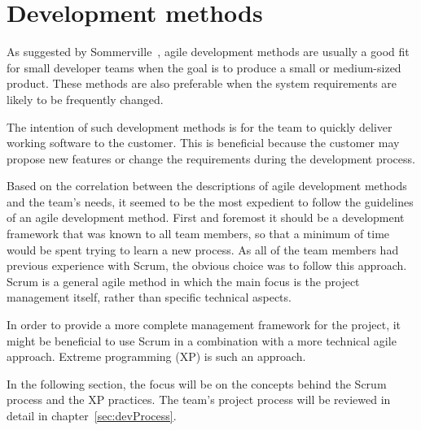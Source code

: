 \section{Development methods}
\label{sec:devMethods}

As suggested by Sommerville~\cite{scrum}, agile development methods are usually a good fit for small developer teams when the goal is to produce a small or medium-sized product. These methods are also preferable when the system requirements are likely to be frequently changed.

The intention of such development methods is for the team to quickly deliver working software to the customer. This is beneficial because the customer may propose new features or change the requirements during the development process.

Based on the correlation between the descriptions of agile development methods and the team's needs, it seemed to be the most expedient to follow the guidelines of an agile development method. First and foremost it should be a development framework that was known to all team members, so that a minimum of time would be spent trying to learn a new process. As all of the team members had previous experience with Scrum, the obvious choice was to follow this approach. Scrum is a general agile method in which the main focus is the project management itself, rather than specific technical aspects.

In order to provide a more complete management framework for the project, it might be beneficial to use Scrum in a combination with a more technical agile approach. Extreme programming (XP) is such an approach.

In the following section, the focus will be on the concepts behind the Scrum process and the XP practices. The team's project process will be reviewed in detail in chapter~\ref{sec:devProcess}.